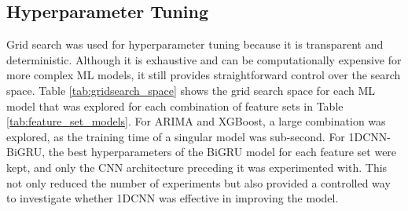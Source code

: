 \documentclass[ %
                    author={Raj Dhakan},
                supervisor={Dr. Ayush Joshi},
                    degree={MSc},
                     title={Ethereum Price Prediction using Internal and External Factors},
                  subtitle={},
                      type={},
                      year={2025}]{dissertation}
\begin{document}
\subsection{Hyperparameter Tuning}
Grid search was used for hyperparameter tuning because it is transparent and deterministic. Although it is exhaustive and can be computationally expensive for more complex ML models, it still provides straightforward control over the search space. Table \ref{tab:gridsearch_space} shows the grid search space for each ML model that was explored for each combination of feature sets in Table \ref{tab:feature_set_models}. For ARIMA and XGBoost, a large combination was explored, as the training time of a singular model was sub-second. For 1DCNN-BiGRU, the best hyperparameters of the BiGRU model for each feature set were kept, and only the CNN architecture preceding it was experimented with. This not only reduced the number of experiments but also provided a controlled way to investigate whether 1DCNN was effective in improving the model.

\begin{table}[ht]
\centering
\caption{ML model grid search space.}
\label{tab:gridsearch_space}
\end{table}
\end{document}
